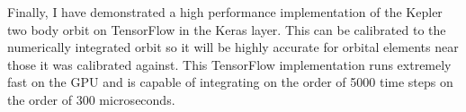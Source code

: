 Finally, I have demonstrated a high performance implementation of the Kepler two body orbit on TensorFlow in the  Keras layer.
This can be calibrated to the numerically integrated orbit so it will be highly accurate for orbital elements near those it was calibrated against.
This TensorFlow implementation runs extremely fast on the GPU 
and is capable of integrating on the order of 5000 time steps on the order of 300 microseconds.